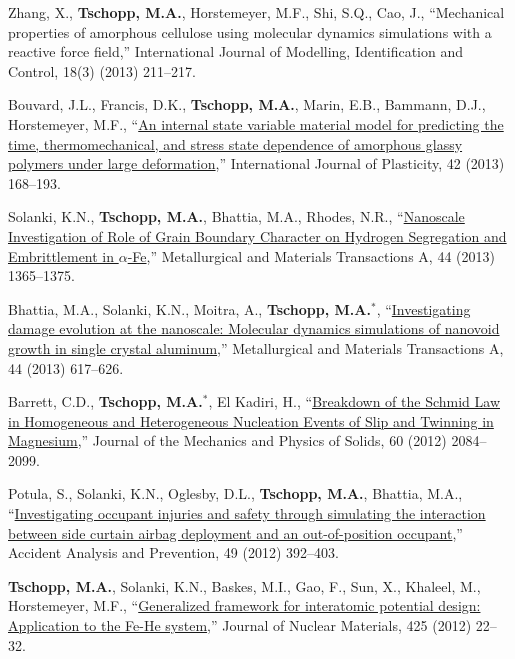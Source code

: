 \begin{cvlist}
\item
{Zhang, X.}, \textbf{Tschopp, M.A.}, Horstemeyer, M.F., Shi, S.Q., Cao, J., ``Mechanical properties of amorphous cellulose using molecular dynamics simulations with a reactive force field,'' International Journal of Modelling, Identification and Control, 18(3) (2013) 211--217.

\item
Bouvard, J.L., Francis, D.K., \textbf{Tschopp, M.A.}, Marin, E.B., Bammann, D.J., Horstemeyer, M.F., ``\href{http://dx.doi.org/10.1016/j.ijplas.2012.10.005}{An internal state variable material model for predicting the time, thermomechanical, and stress state dependence of amorphous glassy polymers under large deformation},'' International Journal of Plasticity, 42 (2013) 168--193.

\item
Solanki, K.N., \textbf{Tschopp, M.A.}, {Bhattia, M.A.}, {Rhodes, N.R.}, ``\href{http://dx.DOI.org/10.1007/s11661-012-1430-z}{Nanoscale Investigation of Role of Grain Boundary Character on Hydrogen Segregation and Embrittlement in $\alpha$-Fe},'' Metallurgical and Materials Transactions A, 44 (2013) 1365--1375.

\item
{Bhattia, M.A.}, Solanki, K.N., Moitra, A., \textbf{Tschopp, M.A.}$^\ast$, ``\href{http://dx.DOI.org/10.1007/s11661-012-1082-z}{Investigating damage evolution at the nanoscale: Molecular dynamics simulations of nanovoid growth in single crystal aluminum},'' Metallurgical and Materials Transactions A, 44 (2013) 617--626.

\item
{Barrett, C.D.}, \textbf{Tschopp, M.A.}$^\ast$, El Kadiri, H., ``\href{http://dx.DOI.org/10.1016/j.jmps.2012.06.015}{Breakdown of the Schmid Law in Homogeneous and Heterogeneous Nucleation Events of Slip and Twinning in Magnesium},'' Journal of the Mechanics and Physics of Solids, 60 (2012) 2084--2099.

\item
{Potula, S.}, Solanki, K.N., Oglesby, D.L., \textbf{Tschopp, M.A.}, Bhattia, M.A., ``\href{http://dx.DOI.org/10.1016/j.aap.2012.03.007}{Investigating occupant injuries and safety through simulating the interaction between side curtain airbag deployment and an out-of-position occupant},'' Accident Analysis and Prevention, 49 (2012) 392--403.

\item
\textbf{Tschopp, M.A.}, Solanki, K.N., Baskes, M.I., Gao, F., Sun, X., Khaleel, M., Horstemeyer, M.F., ``\href{http://dx.DOI.org/10.1016/j.jnucmat.2011.08.003}{Generalized framework for interatomic potential design: Application to the Fe-He system},'' Journal of Nuclear Materials, 425 (2012) 22--32.


\end{cvlist}
